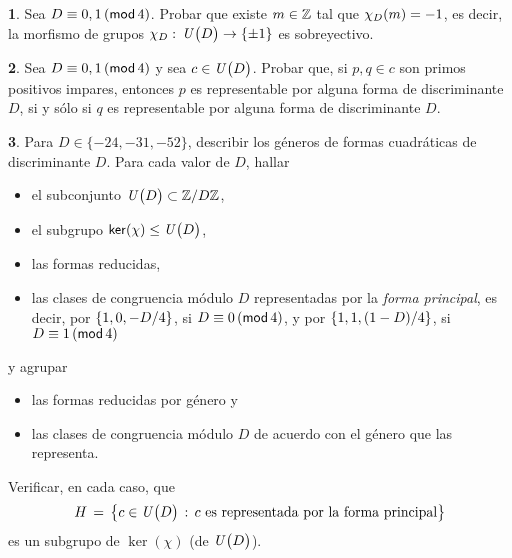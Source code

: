 \theoremstyle{definition}
\newtheorem{ejerDirichlet}{\ejername}[section]


\begin{ejerDirichlet}\label{ejer:dirichlet:sobreyectividad}
	Sea $D\equiv 0,1\tmodulo[4]$. Probar que existe $m\in\Enteros$
	tal que $\varkronecker[D](m)=-1$, es decir, la morfismo de grupos
	$\varkronecker[D]:\,\Unidadesmod[D]\rightarrow\cuadratico$
	es sobreyectivo.
\end{ejerDirichlet}

\begin{ejerDirichlet}\label{ejer:dirichlet:primos-representables}
	Sea $D\equiv 0,1\tmodulo[4]$ y sea $c\in\Unidadesmod[D]$.
	Probar que, si $p,q\in c$ son primos positivos impares,
	entonces $p$ es representable por alguna forma de discriminante
	$D$, si y s\'olo si $q$ es representable por alguna forma de
	discriminante $D$.%
\end{ejerDirichlet}

\begin{ejerDirichlet}\label{ejer:dirichlet:generos}
	Para $D\in\{-24,-31,-52\}$, describir los g\'eneros de formas
	cuadr\'aticas de discriminante $D$.
	Para cada valor de $D$, hallar
	\begin{itemize}
		\item el subconjunto $\Unidadesmod[D]\subset\Enterosmod[D]$,
		\item el subgrupo $\ker(\chi)\subgrp\Unidadesmod[D]$,
		\item las formas reducidas,
		\item las clases de congruencia m\'odulo $D$ representadas
			por la \emph{forma principal}, es decir, por
			$\binaria{1,0,-D/4}$, si $D\equiv 0\tmodulo[4]$,
			y por $\binaria{1,1,(1-D)/4}$, si
			$D\equiv 1\tmodulo[4]$
	\end{itemize}
	y agrupar
	\begin{itemize}
		\item las formas reducidas por g\'enero y
		\item las clases de congruencia m\'odulo $D$ de acuerdo
			con el g\'enero que las representa.
	\end{itemize}
	Verificar, en cada caso, que
	\begin{displaymath}
		H\,=\,\big\{c\in\Unidadesmod[D]\,:\,
			c\text{ es representada por la forma principal}
			\big\}
	\end{displaymath}
	es un subgrupo de $\ker(\chi)$ (de $\Unidadesmod[D]$).
\end{ejerDirichlet}

